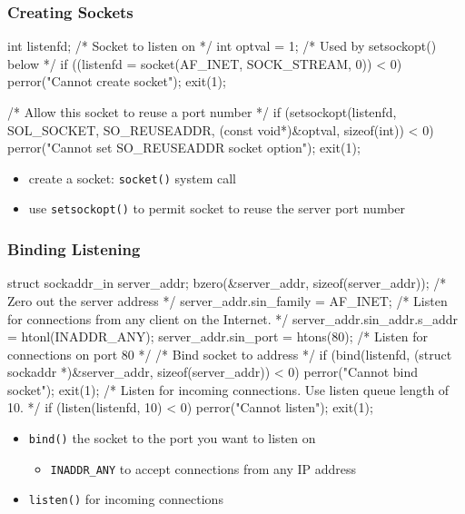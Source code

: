 \documentclass[newPxFont,sthlmFooter,nooffset]{beamer}
\begin{document}
\begin{frame}[t, fragile]
  \frametitle{Creating Sockets}

\begin{codedefnb}
int listenfd;   /* Socket to listen on */
int optval = 1; /* Used by setsockopt() below */
if ((listenfd = socket(AF_INET, SOCK_STREAM, 0)) < 0) {
     perror("Cannot create socket");
     exit(1);
}

/* Allow this socket to reuse a port number */
if (setsockopt(listenfd, SOL_SOCKET, SO_REUSEADDR,
           (const void*)&optval, sizeof(int)) < 0) {
     perror("Cannot set SO_REUSEADDR socket option");
     exit(1);
}
\end{codedefnb}
\begin{itemize}
\item create a socket: \texttt{socket()} system call
\item use \texttt{setsockopt()} to permit socket to reuse the server port number
\end{itemize}
\end{frame}


\begin{frame}[t, fragile]
  \frametitle{Binding Listening}
\begin{codedefnb}
struct sockaddr_in server_addr;
bzero(&server_addr, sizeof(server_addr)); /* Zero out the server address */
server_addr.sin_family = AF_INET;
/* Listen for connections from any client on the Internet. */
server_addr.sin_addr.s_addr = htonl(INADDR_ANY);
server_addr.sin_port = htons(80); /* Listen for connections on port 80 */
/* Bind socket to address */
if (bind(listenfd, (struct sockaddr *)&server_addr,
                          sizeof(server_addr)) < 0) {
     perror("Cannot bind socket");
     exit(1);
}
/* Listen for incoming connections. Use listen queue length of 10. */
if (listen(listenfd, 10) < 0) {
     perror("Cannot listen");
     exit(1);
}
\end{codedefnb}
\begin{itemize}
\item \texttt{bind()} the socket to the port you want to listen on
  \begin{itemize}
  \item  \texttt{INADDR\_ANY} to accept connections from any IP address
  \end{itemize}
\item \texttt{listen()} for incoming connections
\end{itemize}
\end{frame}
\end{document}
